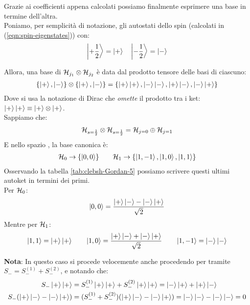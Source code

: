 \documentclass[../../FisicaTeorica.tex]{subfiles}
\begin{document}
Grazie ai coefficienti appena calcolati possiamo finalmente esprimere una base in termine dell'altra.\\
Poniamo, per semplicità di notazione, gli autostati dello spin (calcolati in (\ref{eqn:spin-eigenstates})) con:
\begin{align*}
\Ket{+\frac{1}{2}} = \Ket{+} \quad \Ket{-\frac{1}{2}} =\Ket{-}
\end{align*}

Allora, una base di $\mathcal{H}_{j_1}\otimes \mathcal{H}_{j_2}$ è data dal prodotto tensore delle basi di ciascuno:
\begin{align*}
\{\Ket{+},\Ket{-}\}\otimes \{\Ket{+},\Ket{-}\} = \{\Ket{+}\Ket{+},\Ket{-}\Ket{-}, \Ket{+}\Ket{-}, \Ket{-}\Ket{+}\}
\end{align*}
Dove si usa la notazione di Dirac che \textit{omette} il prodotto tra i ket: $\Ket{+}\Ket{+} \equiv \Ket{+}\otimes \Ket{+}$.\\

Sappiamo che:
\begin{align*}
\mathcal{H}_{s=\frac{1}{2}}\otimes \mathcal{H}_{s=\frac{1}{2}} = \mathcal{H}_{j=0} \oplus \mathcal{H}_{j=1}
\end{align*}
E nello spazio , la base canonica è:
\begin{align*}
\mathcal{H}_0 \to \{\Ket{0,0}\} \qquad \mathcal{H}_1 \to \{\Ket{1,-1},\Ket{1,0},\Ket{1,1}\}
\end{align*}
Osservando la tabella \ref{tab:clebsh-Gordan-5} possiamo scrivere questi ultimi autoket in termini dei primi.\\
Per $\mathcal{H}_0$:
\begin{align*}
\Ket{0,0}=
\frac{\Ket{+}\Ket{-}-\Ket{-}\Ket{+}}{\sqrt{2}}
\end{align*}
Mentre per $\mathcal{H}_1$:
\begin{align*}
\Ket{1,1} = \Ket{+}\Ket{+} \qquad \Ket{1,0} = \frac{\Ket{+}\Ket{-}+\Ket{-}\Ket{+}}{\sqrt{2}} \qquad \Ket{1,-1} = \Ket{-}\Ket{-}
\end{align*}

\textbf{Nota}: In questo caso si procede velocemente anche procedendo per  tramite $S_- = S^{(1)}_- + S^{(2)}_-$, e notando che:
\begin{align*}
S_- \Ket{+}\Ket{+} &= S^{(1)}_{-}\Ket{+}\Ket{+} + S^{(2)}_{-}\Ket{+}\Ket{+} = \Ket{-}\Ket{+}+\Ket{+}\Ket{-}\\
S_- (\Ket{+}\Ket{-}-\Ket{-}\Ket{+})&=(S^{(1)}_- + S^{(2)}_-)(\Ket{+}\Ket{-}-\Ket{-}\Ket{+})=\Ket{-}\Ket{-}-\Ket{-}\Ket{-}=0
\end{align*}
\end{document}
